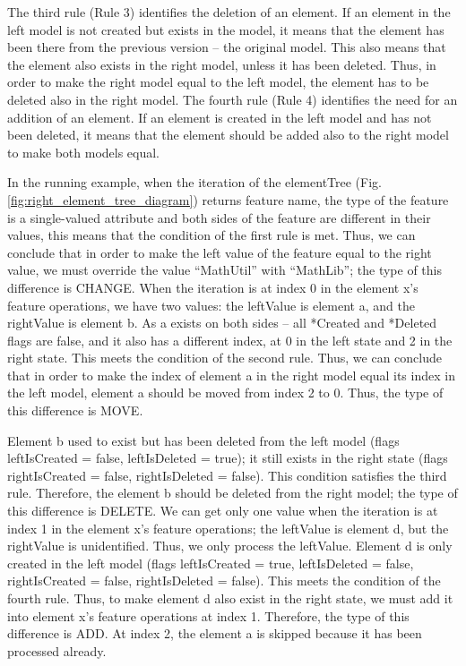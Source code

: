 \documentclass{jot}
\newcommand{\dk}[1]{\textcolor{blue}{\textbf{[Dimitris: #1]}}}
\begin{document}
    The third rule (Rule 3) identifies the deletion of an element. If an element in the left model is not created but exists in the model, it means that the element has been there from the previous version -- the original model. This also means that the element also exists in the right model, unless it has been deleted. Thus, in order to make the right model equal to the left model, the element has to be deleted also in the right model. The fourth rule (Rule 4) identifies the need for an addition of an element. If an element is created in the left model and has not been deleted, it means that the element should be added also to the right model to make both models equal.
    
    In the running example, when the iteration of the \textsf{elementTree} (Fig. \ref{fig:right_element_tree_diagram}) returns feature \textsf{name}, the type of the feature is a single-valued attribute and both sides of the feature are different in their values, this means that the condition of the first rule is met. Thus, we can conclude that in order to make the left value of the feature equal to the right value, we must override the value ``MathUtil'' with ``MathLib''; the type of this difference is \textsf{CHANGE}. When the iteration is at index 0 in the element \textsf{x}'s feature \textsf{operations}, we have two values: the \textsf{leftValue} is element \textsf{a}, and the \textsf{rightValue} is element \textsf{b}. As \textsf{a} exists
    on both sides -- all \textsf{*Created} and \textsf{*Deleted} flags are false, and it also has a different index, at 0 in the left state and 2 in the right state. This meets the condition of the second rule. Thus, we can conclude that in order to make the index of element \textsf{a} in the right model equal its index in the left model, element \textsf{a} should be moved from index 2 to 0. Thus, the type of this difference is \textsf{MOVE}. 
    
    Element \textsf{b} used to exist but has been deleted from the left model (flags \textsf{leftIsCreated} = false, \textsf{leftIsDeleted} = true); it still exists in the right state (flags \textsf{rightIsCreated} = false, \textsf{rightIsDeleted} = false). This condition satisfies the third rule. Therefore, the element \textsf{b} should be deleted from the right model; the type of this difference is \textsf{DELETE}. We can get only one value when the iteration is at index 1 in the element \textsf{x}'s feature \textsf{operations}; the \textsf{leftValue} is element \textsf{d}, but the \textsf{rightValue} is unidentified. Thus, we only process the \textsf{leftValue}. Element \textsf{d} is only created in the left model (flags \textsf{leftIsCreated} = true, \textsf{leftIsDeleted} = false, \textsf{rightIsCreated} = false, \textsf{rightIsDeleted} = false). This meets the condition of the fourth rule. Thus, to make element \textsf{d} also exist in the right state, we must add it into element \textsf{x}'s feature \textsf{operations} at index 1. Therefore, the type of this difference is \textsf{ADD}. At index 2, the element \textsf{a} is skipped because it has been processed already. 
    
\end{document}
